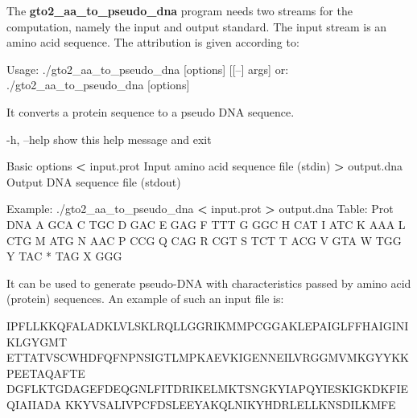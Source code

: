 \documentclass[11pt,]{krantz}
\newenvironment{Shaded}{\begin{snugshade}}{\end{snugshade}}
\newcommand{\OperatorTok}[1]{\textcolor[rgb]{0.43,0.43,0.43}{\textbf{#1}}}
\newcommand{\ExtensionTok}[1]{#1}
\newcommand{\NormalTok}[1]{#1}
\begin{document}
The \textbf{gto2\_aa\_to\_pseudo\_dna} program needs two streams for the
computation, namely the input and output standard. The input stream is
an amino acid sequence. The attribution is given according to:

\begin{Shaded}
\begin{Highlighting}[]
\ExtensionTok{Usage}\NormalTok{: ./gto2_aa_to_pseudo_dna [options] [[--] args]}
   \ExtensionTok{or}\NormalTok{: ./gto2_aa_to_pseudo_dna [options]}

\ExtensionTok{It}\NormalTok{ converts a protein sequence to a pseudo DNA sequence.}

    \ExtensionTok{-h}\NormalTok{, --help        show this help message and exit}

\ExtensionTok{Basic}\NormalTok{ options}
    \OperatorTok{<} \ExtensionTok{input.prot}\NormalTok{      Input amino acid sequence file (stdin)}
    \OperatorTok{>} \ExtensionTok{output.dna}\NormalTok{      Output DNA sequence file (stdout)}

\ExtensionTok{Example}\NormalTok{: ./gto2_aa_to_pseudo_dna }\OperatorTok{<}\NormalTok{ input.prot }\OperatorTok{>}\NormalTok{ output.dna}
\ExtensionTok{Table}\NormalTok{:}
\ExtensionTok{Prot}\NormalTok{    DNA}
\ExtensionTok{A}\NormalTok{       GCA}
\ExtensionTok{C}\NormalTok{       TGC}
\ExtensionTok{D}\NormalTok{       GAC}
\ExtensionTok{E}\NormalTok{       GAG}
\ExtensionTok{F}\NormalTok{       TTT}
\ExtensionTok{G}\NormalTok{       GGC}
\ExtensionTok{H}\NormalTok{       CAT}
\ExtensionTok{I}\NormalTok{       ATC}
\ExtensionTok{K}\NormalTok{       AAA}
\ExtensionTok{L}\NormalTok{       CTG}
\ExtensionTok{M}\NormalTok{       ATG}
\ExtensionTok{N}\NormalTok{       AAC}
\ExtensionTok{P}\NormalTok{       CCG}
\ExtensionTok{Q}\NormalTok{       CAG}
\ExtensionTok{R}\NormalTok{       CGT}
\ExtensionTok{S}\NormalTok{       TCT}
\ExtensionTok{T}\NormalTok{       ACG}
\ExtensionTok{V}\NormalTok{       GTA}
\ExtensionTok{W}\NormalTok{       TGG}
\ExtensionTok{Y}\NormalTok{       TAC}
\ExtensionTok{*}\NormalTok{       TAG}
\ExtensionTok{X}\NormalTok{       GGG}
\end{Highlighting}
\end{Shaded}

It can be used to generate pseudo-DNA with characteristics passed by
amino acid (protein) sequences. An example of such an input file is:

\begin{Shaded}
\begin{Highlighting}[]
\ExtensionTok{IPFLLKKQFALADKLVLSKLRQLLGGRIKMMPCGGAKLEPAIGLFFHAIGINIKLGYGMT}
\ExtensionTok{ETTATVSCWHDFQFNPNSIGTLMPKAEVKIGENNEILVRGGMVMKGYYKKPEETAQAFTE}
\ExtensionTok{DGFLKTGDAGEFDEQGNLFITDRIKELMKTSNGKYIAPQYIESKIGKDKFIEQIAIIADA}
\ExtensionTok{KKYVSALIVPCFDSLEEYAKQLNIKYHDRLELLKNSDILKMFE}
\end{Highlighting}
\end{Shaded}
\end{document}
